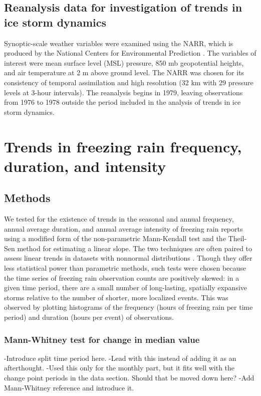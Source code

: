 \documentclass[twocol]{ametsoc}
\begin{document}
\subsection{Reanalysis data for investigation of trends in ice storm dynamics}
Synoptic-scale weather variables were examined using the NARR, which is produced by the National Centers for Environmental Prediction \citep{mesinger2006north}. The variables of interest were mean surface level (MSL) pressure, 850 mb geopotential heights, and air temperature at 2 m above ground level. The NARR was chosen for its consistency of temporal assimilation and high resolution (32 km with 29 pressure levels at 3-hour intervals). The reanalysis begins in 1979, leaving observations from 1976 to 1978 outside the period included in the analysis of trends in ice storm dynamics.


\section{Trends in freezing rain frequency, duration, and intensity}

\subsection{Methods}
We tested for the existence of trends in the seasonal and annual frequency, annual average duration, and annual average intensity of freezing rain reports using a modified form of the non-parametric Mann-Kendall test and the Theil-Sen method for estimating a linear slope. The two techniques are often paired to assess linear trends in datasets with nonnormal distributions \citep{chandler2011statistical}. Though they offer less statistical power than parametric methods, such tests were chosen because the time series of freezing rain observation counts are positively skewed: in a given time period, there are a small number of long-lasting, spatially expansive storms relative to the number of shorter, more localized events. This was observed by plotting histograms of the frequency (hours of freezing rain per time period) and duration (hours per event) of observations.

\subsubsection{Mann-Whitney test for change in median value}
-Introduce split time period here.
-Lead with this instead of adding it as an afterthought.
-Used this only for the monthly part, but it fits well with the change point periods in the data section. Should that be moved down here?
-Add Mann-Whitney reference and introduce it.
\end{document}
